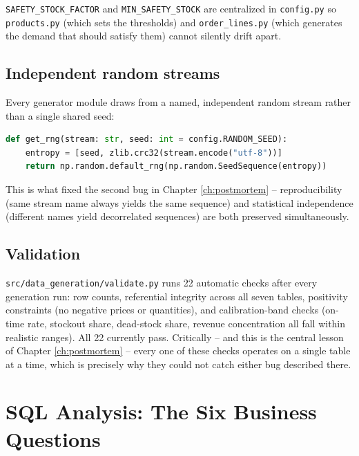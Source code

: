 \documentclass[11pt,a4paper]{report}
\begin{document}
\texttt{SAFETY\_STOCK\_FACTOR} and \texttt{MIN\_SAFETY\_STOCK} are centralized
in \texttt{config.py} so \texttt{products.py} (which sets the thresholds) and
\texttt{order\_lines.py} (which generates the demand that should satisfy
them) cannot silently drift apart.

\section{Independent random streams}

Every generator module draws from a named, independent random stream rather
than a single shared seed:

\begin{lstlisting}[language=Python, caption=Named independent streams (src/data\_generation/utils.py)]
def get_rng(stream: str, seed: int = config.RANDOM_SEED):
    entropy = [seed, zlib.crc32(stream.encode("utf-8"))]
    return np.random.default_rng(np.random.SeedSequence(entropy))
\end{lstlisting}

This is what fixed the second bug in Chapter \ref{ch:postmortem} --
reproducibility (same stream name always yields the same sequence) and
statistical independence (different names yield decorrelated sequences)
are both preserved simultaneously.

\section{Validation}

\texttt{src/data\_generation/validate.py} runs 22 automatic checks after
every generation run: row counts, referential integrity across all seven
tables, positivity constraints (no negative prices or quantities), and
calibration-band checks (on-time rate, stockout share, dead-stock share,
revenue concentration all fall within realistic ranges). All 22 currently
pass. Critically -- and this is the central lesson of Chapter
\ref{ch:postmortem} -- every one of these checks operates on a single table
at a time, which is precisely why they could not catch either bug described
there.

\chapter{SQL Analysis: The Six Business Questions}
\end{document}
